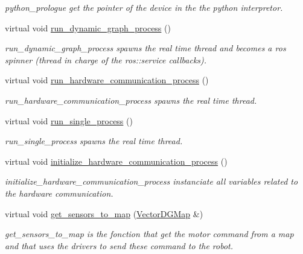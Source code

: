 \begin{DoxyCompactItemize}
\begin{DoxyCompactList}\small\item\em python\+\_\+prologue get the pointer of the device in the the python interpretor. \end{DoxyCompactList}\item 
virtual void \hyperlink{classdynamic__graph_1_1DynamicGraphManager_a8e23eb4ce0acaef397bf84a770b9f015}{run\+\_\+dynamic\+\_\+graph\+\_\+process} ()
\begin{DoxyCompactList}\small\item\em run\+\_\+dynamic\+\_\+graph\+\_\+process spawns the real time thread and becomes a ros spinner (thread in charge of the ros\+::service callbacks). \end{DoxyCompactList}\item 
virtual void \hyperlink{classdynamic__graph_1_1DynamicGraphManager_a81e7cb10262383030c10156730d39ce8}{run\+\_\+hardware\+\_\+communication\+\_\+process} ()
\begin{DoxyCompactList}\small\item\em run\+\_\+hardware\+\_\+communication\+\_\+process spawns the real time thread. \end{DoxyCompactList}\item 
virtual void \hyperlink{classdynamic__graph_1_1DynamicGraphManager_ad13f5aef302173293a0c162c28505ef8}{run\+\_\+single\+\_\+process} ()
\begin{DoxyCompactList}\small\item\em run\+\_\+single\+\_\+process spawns the real time thread. \end{DoxyCompactList}\item 
virtual void \hyperlink{classdynamic__graph_1_1DynamicGraphManager_ae3927887762c52c7bf50ab5a565c3077}{initialize\+\_\+hardware\+\_\+communication\+\_\+process} ()
\begin{DoxyCompactList}\small\item\em initialize\+\_\+hardware\+\_\+communication\+\_\+process instanciate all variables related to the hardware communication. \end{DoxyCompactList}\item 
virtual void \hyperlink{classdynamic__graph_1_1DynamicGraphManager_a7bddce83d5185433041ad27610b85b3a}{get\+\_\+sensors\+\_\+to\+\_\+map} (\hyperlink{namespacedynamic__graph_a51212ed7fa4ae81e7b362a27f09b7ab8}{Vector\+D\+G\+Map} \&)
\begin{DoxyCompactList}\small\item\em get\+\_\+sensors\+\_\+to\+\_\+map is the fonction that get the motor command from a map and that uses the drivers to send these command to the robot. \end{DoxyCompactList}\item 

\end{DoxyCompactItemize}
